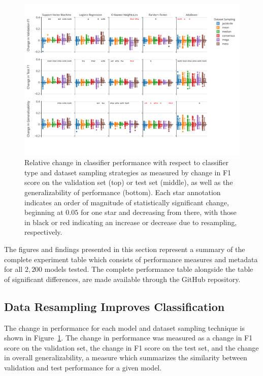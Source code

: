 \documentclass[10pt]{SelfArx} %
\begin{document}
\begin{figure}[tbh!]\centering
\includegraphics[width=\linewidth]{figures/1.pdf}
\caption{Relative change in classifier performance with respect to classifier type and dataset sampling strategies as
measured by change in F1 score on the validation set (top) or test set (middle), as well as the generalizability of
performance (bottom). Each star annotation indicates an order of magnitude of statistically significant change,
beginning at $0.05$ for one star and decreasing from there, with those in black or red indicating an increase or
decrease due to resampling, respectively.}
\label{fig:overall_perf}
\end{figure}

The figures and findings presented in this section represent a summary of the complete experiment table which consists
of performance measures and metadata for all $2,200$ models tested. The complete performance table alongside the table
of significant differences, are made available through the GitHub repository.

\subsection*{Data Resampling Improves Classification}

The change in performance for each model and dataset sampling technique is shown in Figure~\ref{fig:overall_perf}. The
change in performance was measured as a change in F1 score on the validation set, the change in F1 score on the test
set, and the change in overall generalizability, a measure which summarizes the similarity between validation and test
performance for a given model.
\end{document}

